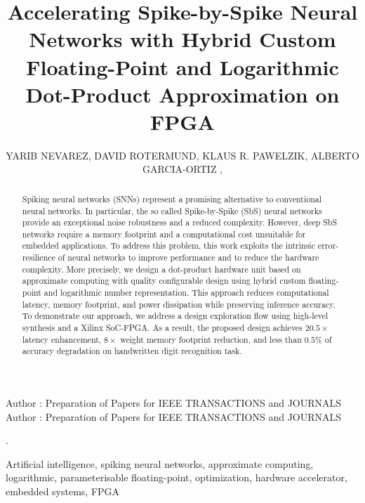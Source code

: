 \title {Accelerating Spike-by-Spike Neural Networks with Hybrid Custom Floating-Point and Logarithmic Dot-Product Approximation on FPGA}

\author{
	\uppercase{Yarib Nevarez},	
	\uppercase{David Rotermund},
	\uppercase{Klaus R. Pawelzik},
	\uppercase{Alberto Garcia-Ortiz} ,
}

\address[1]{Institute of Electrodynamics and Microelectronics, University of Bremen, Bremen 28359, Germany (e-mail: nevarez@item.uni-bremen.de)}

\address[2]{Institute for Theoretical Physics, University of Bremen, Bremen 28359, Germany (e-mail: davrot@@neuro.uni-bremen.de)}

\address[3]{Institute for Theoretical Physics, University of Bremen, Bremen 28359, Germany (e-mail: pawelzik@@neuro.uni-bremen.de)}

\address[4]{Institute of Electrodynamics and Microelectronics, University of Bremen, Bremen 28359, Germany (e-mail: agaracia@item.uni-bremen.de)}


\markboth
{Author \headeretal: Preparation of Papers for IEEE TRANSACTIONS and JOURNALS}
{Author \headeretal: Preparation of Papers for IEEE TRANSACTIONS and JOURNALS}

.

\begin{abstract}
  Spiking neural networks (SNNs) represent a promising alternative to
  conventional neural networks. In particular, the so called
  Spike-by-Spike (SbS) neural networks provide an exceptional noise
  robustness and a reduced complexity. However, deep SbS networks
  require a memory footprint and a computational cost unsuitable for
  embedded applications. To address this problem, this work exploits
  the intrinsic error-resilience of neural networks to improve
  performance and to reduce the hardware complexity. More precisely, we
  design a dot-product hardware unit based on approximate computing
  with quality configurable design using hybrid custom floating-point and logarithmic number representation. This approach reduces
  computational latency, memory footprint, and power dissipation while
  preserving inference accuracy. To demonstrate our approach, we address a
  design exploration flow using high-level synthesis and a Xilinx SoC-FPGA.
  As a result, the proposed design achieves $20.5\times$
  latency enhancement, $8\times$ weight memory footprint reduction,
  and less than $0.5\%$ of accuracy degradation on handwritten digit
  recognition task.
	
\end{abstract}

\begin{keywords}
Artificial intelligence, spiking neural networks, approximate computing, logarithmic, parameterisable floating-point, optimization, hardware accelerator, embedded systems, FPGA
\end{keywords}

\titlepgskip=-15pt

\maketitle
